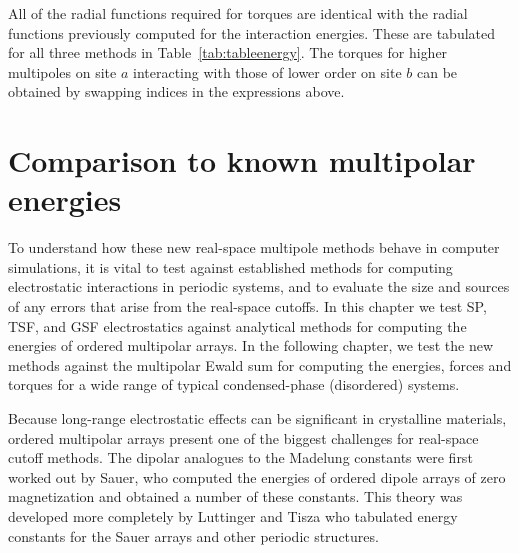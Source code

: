 All of the radial functions required for torques are identical with
the radial functions previously computed for the interaction energies.
These are tabulated for all three methods in Table~\ref{tab:tableenergy}.  The torques for higher multipoles on site
$a$ interacting with those of lower order on site
$b$ can be obtained by swapping indices in the expressions
above.
\section{Comparison to known multipolar energies}

To understand how these new real-space multipole methods behave in
computer simulations, it is vital to test against established methods
for computing electrostatic interactions in periodic systems, and to
evaluate the size and sources of any errors that arise from the
real-space cutoffs. In this chapter we test SP, TSF, and GSF
electrostatics against analytical methods for computing the energies
of ordered multipolar arrays.  In the following chapter, we test the new
methods against the multipolar Ewald sum for computing the energies,
forces and torques for a wide range of typical condensed-phase
(disordered) systems.

Because long-range electrostatic effects can be significant in
crystalline materials, ordered multipolar arrays present one of the
biggest challenges for real-space cutoff methods.  The dipolar
analogues to the Madelung constants were first worked out by Sauer,
who computed the energies of ordered dipole arrays of zero
magnetization and obtained a number of these constants.\cite{Sauer}
This theory was developed more completely by Luttinger and
Tisza\cite{LT,LT2} who tabulated energy constants for the Sauer arrays
and other periodic structures.  

